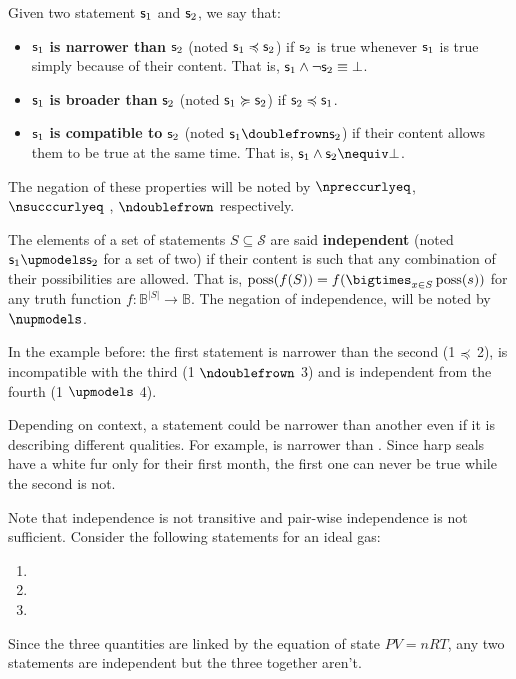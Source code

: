 \documentclass[11pt,letterpaper,fleqn]{memoir} %
\begin{document}
\begin{mathSection}

\begin{defn}
	Given two statement $\mathsf{s}_1$ and $\mathsf{s}_2$, we say that:
	\begin{itemize}
		\item $\mathsf{s}_1$ \textbf{is narrower than} $\mathsf{s}_2$ (noted $\mathsf{s}_1 \preccurlyeq \mathsf{s}_2$) if $\mathsf{s}_2$ is true whenever $\mathsf{s}_1$ is true simply because of their content. That is, $\mathsf{s}_1 \wedge \neg \mathsf{s}_2 \equiv \bot$.
		\item $\mathsf{s}_1$ \textbf{is broader than} $\mathsf{s}_2$ (noted $\mathsf{s}_1 \succcurlyeq \mathsf{s}_2$) if $\mathsf{s}_2 \preccurlyeq \mathsf{s}_1$.
		\item $\mathsf{s}_1$ \textbf{is compatible to} $\mathsf{s}_2$ (noted $\stmt_1 \comp \stmt_2$) if their content allows them to be true at the same time. That is, $\stmt_1 \AND \stmt_2 \nequiv \contradiction$.

	\end{itemize}
	The negation of these properties will be noted by $\nnarrower$, $\nbroader$ , $\ncomp$ respectively.
\end{defn}
\begin{defn}
	The elements of a set of statements $S \subseteq \mathcal{S}$ are said \textbf{independent} (noted $\stmt_1 \indep \stmt_2$ for a set of two) if their content is such that any combination of their possibilities are allowed. That is, $\poss(f(S)) = f(\bigtimes_{x \in S} \poss(s))$ for any truth function $f : \mathbb{B}^{|S|} \to \mathbb{B}$. The negation of independence, will be noted by $\nindep$.
\end{defn}

\end{mathSection}

In the example before: the first statement is narrower than the second (1 $\preccurlyeq$ 2), is incompatible with the third (1 $\ncomp$ 3) and is independent from the fourth (1 $\indep$ 4).

Depending on context, a statement could be narrower than another even if it is describing different qualities. For example,  is narrower than . Since harp seals have a white fur only for their first month, the first one can never be true while the second is not.

Note that independence is not transitive and pair-wise independence is not sufficient. Consider the following statements for an ideal gas:
\begin{enumerate}
	\item {}
	\item {}
	\item {}
\end{enumerate}
Since the three quantities are linked by the equation of state $PV=nRT$, any two statements are independent but the three together aren't.
\end{document}
